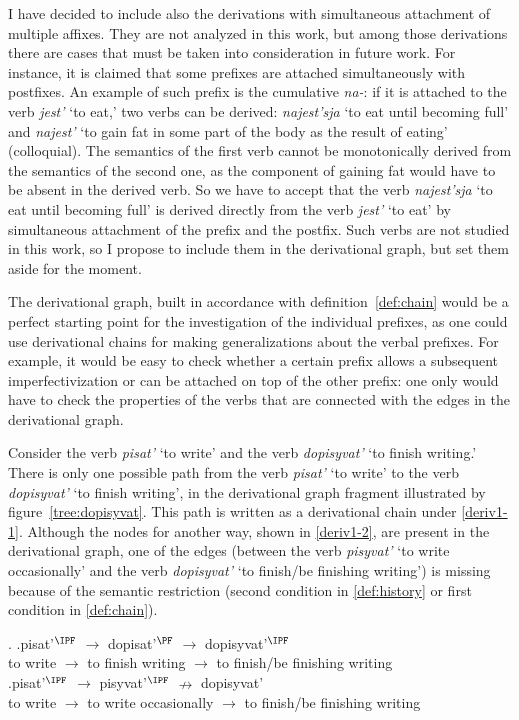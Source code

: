 I have decided to include also the derivations with simultaneous attachment of multiple affixes. They are not analyzed in this work, but among those derivations there are cases that must be taken into consideration in future work. For instance, it is claimed that some prefixes are attached simultaneously with postfixes. An example of such prefix is the cumulative \textit{na-}: if it is attached to the verb \textit{jest'} `to eat,' two verbs can be derived: \textit{najest'sja} `to eat until becoming full' and \textit{najest'} `to gain fat in some part of the body as the result of eating' (colloquial). The semantics of the first verb cannot be  monotonically derived from the semantics of the second one, as the component of gaining fat would have to be absent in the derived verb. So we have to accept that the verb \textit{najest'sja} `to eat until becoming full' is derived directly from the verb \textit{jest'} `to eat' by simultaneous attachment of the prefix and the postfix. Such verbs are not studied in this work, so I propose to include them in the derivational graph, but set them aside for the moment.
 
The derivational graph, built in accordance with definition~\ref{def:chain} would be a perfect starting point for the investigation of the individual prefixes, as one could use derivational chains for making generalizations about the verbal prefixes. For example, it would be easy to check whether a certain prefix allows a subsequent imperfectivization or can be attached on top of the other prefix: one only would have to check the properties of the verbs that are connected with the edges in the derivational graph. 

Consider the verb {\it pisat'} `to write' and the verb {\it dopisyvat'} `to finish writing.' There is only one possible path from the verb {\it pisat'} `to write' to the verb {\it dopisyvat'} `to finish writing', in the derivational graph fragment illustrated by figure~\ref{tree:dopisyvat}. This path is written as a derivational chain under \ref{deriv1-1}. Although the nodes for another way, shown in \ref{deriv1-2}, are present in the derivational graph, one of the edges (between the verb \textit{pisyvat'} `to write occasionally' and the verb \textit{dopisyvat'} `to finish/be finishing writing') is missing because of the semantic restriction (second condition in \ref{def:history} or first condition in \ref{def:chain}).

\ex.\label{deriv1} \ag.\label{deriv1-1}pisat'$^\IPF$ $\rightarrow$ dopisat'$^\PF$ $\rightarrow$ dopisyvat'$^\IPF$\\
{to write} $\rightarrow$ {to finish writing} $\rightarrow$ {to finish/be finishing writing}\\
\bg.\label{deriv1-2}pisat'$^\IPF$ $\rightarrow$ pisyvat'$^\IPF$ $\nrightarrow$ dopisyvat'\\
{to write} $\rightarrow$ {to write occasionally} $\rightarrow$ {to finish/be finishing writing}\\

